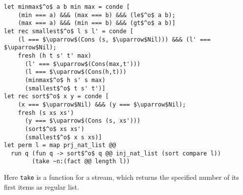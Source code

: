 \documentclass[10pt, oneside, nocopyrightspace]{sigplanconf}
\begin{document}
\begin{lstlisting}[mathescape=true]
let minmax$^o$ a b min max = conde [
    (min === a) &&& (max === b) &&& (le$^o$ a b);
    (max === a) &&& (min === b) &&& (gt$^o$ a b)]
let rec smallest$^o$ l s l' = conde [       
    (l === $\uparrow$(Cons (s, $\uparrow$Nil))) &&& (l' === $\uparrow$Nil);
    fresh (h t s' t' max)
      (l' === $\uparrow$(Cons(max,t')))
      (l === $\uparrow$(Cons(h,t)))
      (minmax$^o$ h s' s max)
      (smallest$^o$ t s' t')] 
let rec sort$^o$ x y = conde [
    (x === $\uparrow$Nil) &&& (y === $\uparrow$Nil);
    fresh (s xs xs')
      (y === $\uparrow$(Cons (s, xs')))
      (sort$^o$ xs xs')       
      (smallest$^o$ x s xs)]
let perm l = map prj_nat_list @@
  run q (fun q -> sort$^o$ q @@ inj_nat_list (sort compare l))
        (take ~n:(fact @@ length l))
\end{lstlisting}

\begin{comment}
\begin{lstlisting}[mathescape=true]
   let perm l = map prj_int_list @@ 
     run q 
       (fun q -> sort$^o$ q (inj_int_list (sort compare l))) 
       (take ~n:(fact @@ length l))
\end{lstlisting}
\end{comment}

Here \lstinline{take} is a function for a stream, which returns the specified 
number of its first items as regular list.

\begin{comment}
\section{Conclusion}

We presented strongly typed implementation of miniKanren for OCaml. Our implementation
passes all tests, written for miniKanren (including those for disequality constraints);
in addition we implemented many of interesting relational programs, known from
the literature. We claim, that our implementation can be used both as a convenient
relational DSL for OCaml and an experimental framework for future research in the area of
relational programming. 

The source code of our implementation is accessible from \url{https://github.com/dboulytchev/miniKanren-ocaml-typed}.

We also want to express our gratitude to William Byrd, who infected us with relational programming, for 
the time he sacrificed to very instructive and clarifying conversations.
\end{comment}
\end{document}
